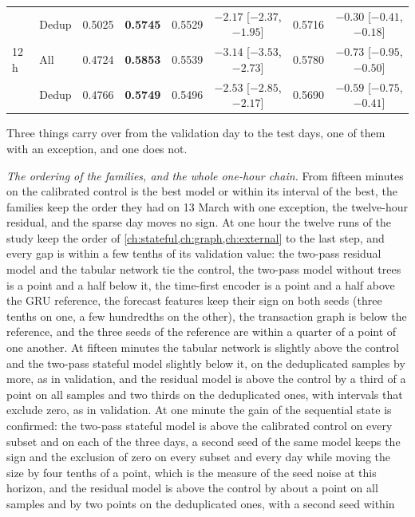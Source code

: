 \begin{table}[t]
\begin{fittable}
\begin{tabular}{llcccccc}
       & Dedup & 0.5025 & \textbf{0.5745} & 0.5529 & $-2.17$ [$-2.37$, $-1.95$] & 0.5716 & $-0.30$ [$-0.41$, $-0.18$] \\
12 h   & All   & 0.4724 & \textbf{0.5853} & 0.5539 & $-3.14$ [$-3.53$, $-2.73$] & 0.5780 & $-0.73$ [$-0.95$, $-0.50$] \\
       & Dedup & 0.4766 & \textbf{0.5749} & 0.5496 & $-2.53$ [$-2.85$, $-2.17$] & 0.5690 & $-0.59$ [$-0.75$, $-0.41$] \\
\bottomrule
\end{tabular}\end{fittable}
\end{table}

Three things carry over from the validation day to the test days, one of them with an
exception, and one does not.

\emph{The ordering of the families, and the whole one-hour chain.}  From fifteen minutes on the
calibrated control is the best model or within its interval of the best, the families keep
the order they had on 13 March with one exception, the twelve-hour residual, and the sparse
day moves no sign.  At one hour the
twelve runs of the study keep the order of \cref{ch:stateful,ch:graph,ch:external} to the
last step, and every gap is within a few tenths of its validation value: the two-pass
residual model and the tabular network tie the control, the two-pass model without trees is
a point and a half below it, the time-first encoder is a point and a half above the GRU
reference, the forecast features keep their sign on both seeds (three tenths on one, a few
hundredths on the other), the transaction graph is
below the reference, and the three seeds of the reference are within a quarter of a point of
one another.  At fifteen minutes the tabular network is slightly above the control and the
two-pass stateful model slightly below it, on the deduplicated samples by more, as in
validation, and the residual model is above the control by a third of a point on all samples
and two thirds on the deduplicated ones, with intervals that exclude zero, as in validation.  At one minute the gain of the sequential state is confirmed: the two-pass
stateful model is above the calibrated control on every subset and on each of the three
days, a second seed of the same model keeps the sign and the exclusion of zero on every
subset and every day while moving the size by four tenths of a point, which is the measure
of the seed noise at this horizon, and the residual model is above the control by about a
point on all samples and by two points on the deduplicated ones, with a second seed within
